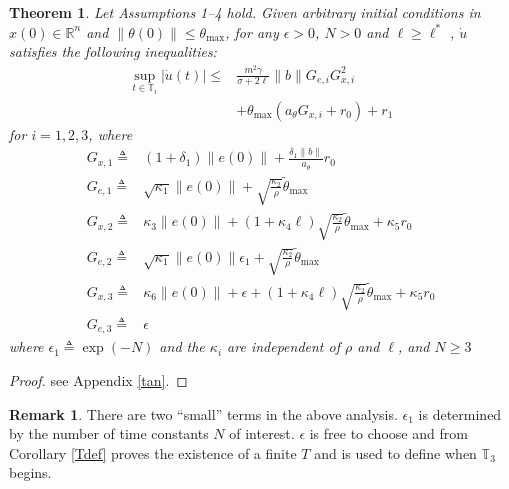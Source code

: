 \documentclass[10pt,journal]{IEEEtran}
\theoremstyle{plain}%
\newtheorem{thm}{Theorem}%
\theoremstyle{definition}
\newtheorem{rem}{Remark}
\newcommand{\be}[0]{\begin{equation}}
\newcommand{\ee}[0]{\end{equation}}
\newcommand{\norms}[1]{\lVert#1\rVert}
\newcommand{\normB}[0]{\norms}
\let\norm=\normB
\newcommand{\abs}[1]{\left\lvert#1\right\rvert}
\renewcommand{\Re}[0]{\mathbb R}
\renewcommand{\IEEEQED}{\IEEEQEDopen}
\begin{document}
\begin{thm}\label{thmudot}
Let Assumptions 1--4 hold. Given arbitrary initial conditions in ${x(0)\in\Re^n}$ and ${\norm{\theta(0)}\leq \theta_\text{max}}$, for any  ${\epsilon>0}$, ${N>0}$ and ${\ell\geq\ell^*}$ , $\dot u$ satisfies the following inequalities:
\be\label{ub1}
\begin{split}
 \sup_{t\in\mathbb T_i}\abs{\dot u(t)} \leq &\frac{m^2\gamma}{\sigma+2\ell}\norm b G_{e,i} G_{x,i}^2  \\ &+ \theta_\text{max}\left(a_\theta G_{x,i}+r_0\right) + r_1
\end{split}
\ee for $i=1,2,3$, where
\be\label{GS}\begin{split}
G_{x,1}\triangleq & (1+\delta_1) \norm{e(0)} +\frac{\delta_1 \norm b }{a_\theta}r_0\\
G_{e,1}\triangleq & \sqrt{\kappa_1}\norm{e(0)}+\sqrt{\frac{\kappa_2}{\rho}}\tilde\theta_\text{max} \\
G_{x,2}\triangleq &\kappa_3 \norm{e(0)} + \left(1+\kappa_4 \ell\right)  \sqrt{\frac{\kappa_2}{\rho}}  \tilde\theta_\text{max} +\kappa_5 r_0\\
G_{e,2}\triangleq &\sqrt{\kappa_1}\norm{e(0)}\epsilon_1+\sqrt{\frac{\kappa_2}{\rho}}\tilde\theta_\text{max}\\
G_{x,3}\triangleq &\kappa_6\norm{e(0)}+\epsilon+\left(1+\kappa_4 \ell\right)  \sqrt{\frac{\kappa_2}{\rho}}  \tilde\theta_\text{max} +\kappa_5 r_0\\
G_{e,3}\triangleq & \epsilon
\end{split}
\ee
where ${\epsilon_1\triangleq\exp(-N)}$ and the $\kappa_i$ are independent of $\rho$ and $\ell$, and $N\geq 3$
\end{thm}
\begin{proof}see Appendix \ref{tan}.  \let\IEEEQED\relax \end{proof}

\begin{rem}
There are two ``small'' terms in the above analysis. $\epsilon_1$ is determined by the number of time constants $N$ of interest. $\epsilon$ is free to choose and from Corollary \ref{Tdef} proves the existence of a finite $T$ and is used to define when  $\mathbb T_3$ begins.  \end{rem}
\end{document}
